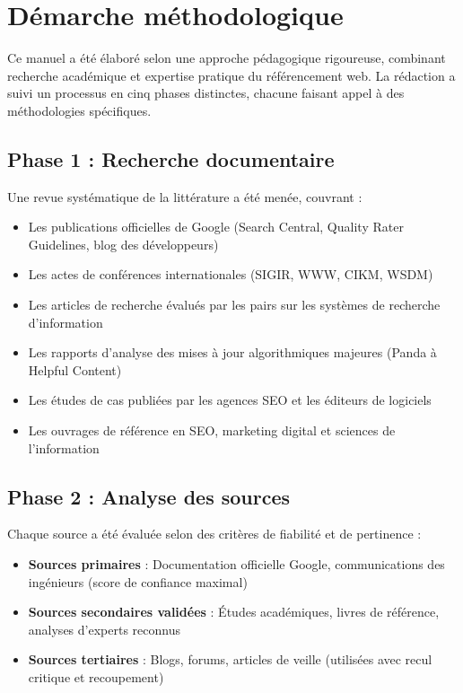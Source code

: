 \documentclass[12pt,a4paper,twoside]{report}
\begin{document}
\section*{Démarche méthodologique}

Ce manuel a été élaboré selon une approche pédagogique rigoureuse, combinant recherche académique et expertise pratique du référencement web. La rédaction a suivi un processus en cinq phases distinctes, chacune faisant appel à des méthodologies spécifiques.

\subsection*{Phase 1 : Recherche documentaire}

Une revue systématique de la littérature a été menée, couvrant :
\begin{itemize}
    \item Les publications officielles de Google (Search Central, Quality Rater Guidelines, blog des développeurs)
    \item Les actes de conférences internationales (SIGIR, WWW, CIKM, WSDM)
    \item Les articles de recherche évalués par les pairs sur les systèmes de recherche d'information
    \item Les rapports d'analyse des mises à jour algorithmiques majeures (Panda à Helpful Content)
    \item Les études de cas publiées par les agences SEO et les éditeurs de logiciels
    \item Les ouvrages de référence en SEO, marketing digital et sciences de l'information
\end{itemize}

\subsection*{Phase 2 : Analyse des sources}

Chaque source a été évaluée selon des critères de fiabilité et de pertinence :
\begin{itemize}
    \item \textbf{Sources primaires} : Documentation officielle Google, communications des ingénieurs (score de confiance maximal)
    \item \textbf{Sources secondaires validées} : Études académiques, livres de référence, analyses d'experts reconnus
    \item \textbf{Sources tertiaires} : Blogs, forums, articles de veille (utilisées avec recul critique et recoupement)
\end{itemize}
\end{document}
